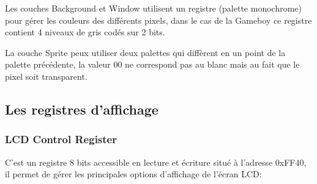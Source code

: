 \documentclass{report}
\begin{document}
Les couches Background et Window utilisent un registre (palette monochrome) pour gérer les
couleurs des différents pixels, dans le cas de la Gameboy ce registre contient
4 niveaux de gris codés sur 2 bits.

La couche Sprite peux utiliser deux palettes qui diffèrent en un point de la
palette précédente, la valeur 00 ne correspond pas au blanc mais au fait que
le pixel soit transparent.\\

\subsection{Les registres d'affichage}
\subsubsection{LCD Control Register}
C'est un registre 8 bits accessible en lecture et écriture situé à l'adresse 0xFF40, il permet de gérer les principales options d'affichage de l'écran LCD:\\
\end{document}
